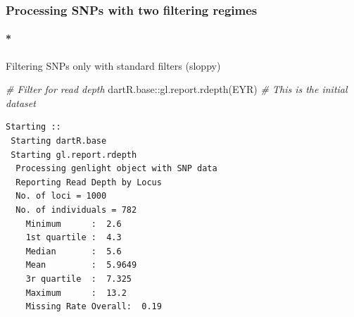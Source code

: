 \documentclass[
  letterpaper,
  DIV=11,
  numbers=noendperiod]{scrreprt}
\let\oldparagraph\paragraph
\renewcommand{\paragraph}[1]{\oldparagraph{#1}\mbox{}}
\newenvironment{Shaded}{\begin{snugshade}}{\end{snugshade}}
\newcommand{\CommentTok}[1]{\textcolor[rgb]{0.38,0.63,0.69}{\textit{#1}}}
\newcommand{\FunctionTok}[1]{\textcolor[rgb]{0.02,0.16,0.49}{#1}}
\newcommand{\NormalTok}[1]{\textcolor[rgb]{0.00,0.44,0.13}{#1}}
\newcommand{\SpecialCharTok}[1]{\textcolor[rgb]{0.25,0.44,0.63}{#1}}
\let\textttOrig\texttt
\renewcommand{\texttt}[1]{\textttOrig{\color{blue}{#1}}}
\begin{document}
\hypertarget{processing-snps-with-two-filtering-regimes}{%
\subsubsection*{Processing SNPs with two filtering
regimes}\label{processing-snps-with-two-filtering-regimes}}

\hypertarget{filtering-snps-only-with-standard-filters-sloppy}{%
\paragraph*{Filtering SNPs only with standard filters
(sloppy)}\label{filtering-snps-only-with-standard-filters-sloppy}}

\begin{Shaded}
\begin{Highlighting}[]
\CommentTok{\# Filter for read depth}
\NormalTok{dartR.base}\SpecialCharTok{::}\FunctionTok{gl.report.rdepth}\NormalTok{(EYR)  }\CommentTok{\# This is the initial dataset}
\end{Highlighting}
\end{Shaded}

\begin{verbatim}
Starting :: 
 Starting dartR.base 
 Starting gl.report.rdepth 
  Processing genlight object with SNP data
  Reporting Read Depth by Locus
  No. of loci = 1000 
  No. of individuals = 782 
    Minimum      :  2.6 
    1st quartile :  4.3 
    Median       :  5.6 
    Mean         :  5.9649 
    3r quartile  :  7.325 
    Maximum      :  13.2 
    Missing Rate Overall:  0.19 
\end{verbatim}

\begin{figure}[H]

{\centering \texttt{[image: Session10\_SexLinkedMarkers\_files/figure-pdf/unnamed-chunk-13-1.pdf]}

}

\end{figure}
\end{document}
